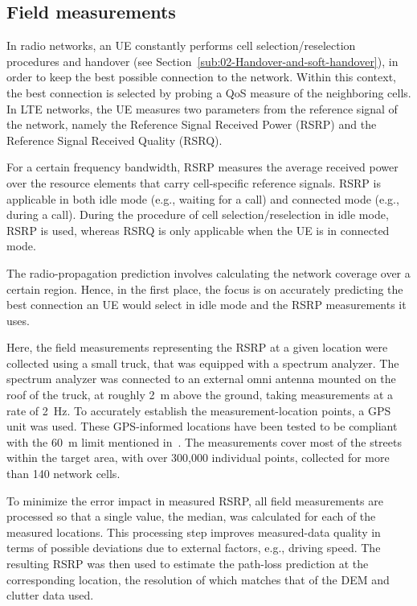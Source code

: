 \subsection{Field measurements \label{sub:05-Field_measurements}}

In radio networks, an UE constantly performs cell selection/reselection
procedures and handover (see Section~\ref{sub:02-Handover-and-soft-handover}),
in order to keep the best possible connection to the network. Within
this context, the best connection is selected by probing a QoS measure
of the neighboring cells. In LTE networks, the UE measures two parameters
from the reference signal of the network, namely the Reference Signal
Received Power (RSRP) and the Reference Signal Received Quality (RSRQ).

For a certain frequency bandwidth, RSRP measures the average received
power over the resource elements that carry cell-specific reference
signals. RSRP is applicable in both idle mode (e.g., waiting for a
call) and connected mode (e.g., during a call). During the procedure
of cell selection/reselection in idle mode, RSRP is used, whereas
RSRQ is only applicable when the UE is in connected mode. 

The radio-propagation prediction involves calculating the network
coverage over a certain region. Hence, in the first place, the focus
is on accurately predicting the best connection an UE would select
in idle mode and the RSRP measurements it uses.

Here, the field measurements representing the RSRP at a given location
were collected using a small truck, that was equipped with a spectrum
analyzer. The spectrum analyzer was connected to an external omni
antenna mounted on the roof of the truck, at roughly 2~m above the
ground, taking measurements at a rate of 2~Hz. To accurately establish
the measurement-location points, a GPS unit was used. These GPS-informed
locations have been tested to be compliant with the 60~m limit mentioned
in~\cite{Aarnaes-Tuning_of_empirical_radio_propagation_models_effect_of_location_accuracy:2004}.
The measurements cover most of the streets within the target area,
with over 300,000 individual points, collected for more than 140 network
cells.

To minimize the error impact in measured RSRP, all field measurements
are processed so that a single value, the median, was calculated for
each of the measured locations. This processing step improves measured-data
quality in terms of possible deviations due to external factors, e.g.,
driving speed. The resulting RSRP was then used to estimate the path-loss
prediction at the corresponding location, the resolution of which
matches that of the DEM and clutter data used.


